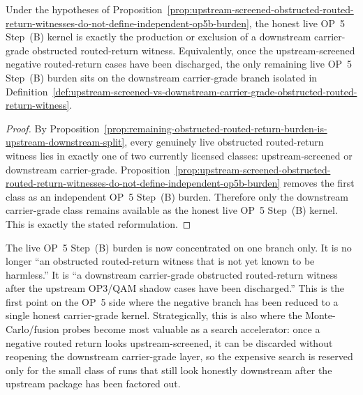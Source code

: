 \begin{corollary}
\label{cor:live-op5b-kernel-reduces-to-downstream-carrier-grade-obstructed-routed-return-branch}
Under the hypotheses of Proposition~\ref{prop:upstream-screened-obstructed-routed-return-witnesses-do-not-define-independent-op5b-burden}, the honest live OP~5 Step~(B) kernel is exactly the production or exclusion of a downstream carrier-grade obstructed routed-return witness. Equivalently, once the upstream-screened negative routed-return cases have been discharged, the only remaining live OP~5 Step~(B) burden sits on the downstream carrier-grade branch isolated in Definition~\ref{def:upstream-screened-vs-downstream-carrier-grade-obstructed-routed-return-witness}.
\end{corollary}

\begin{proof}
By Proposition~\ref{prop:remaining-obstructed-routed-return-burden-is-upstream-downstream-split}, every genuinely live obstructed routed-return witness lies in exactly one of two currently licensed classes: upstream-screened or downstream carrier-grade. Proposition~\ref{prop:upstream-screened-obstructed-routed-return-witnesses-do-not-define-independent-op5b-burden} removes the first class as an independent OP~5 Step~(B) burden. Therefore only the downstream carrier-grade class remains available as the honest live OP~5 Step~(B) kernel. This is exactly the stated reformulation.
\end{proof}

\begin{remark}
\label{rem:what-fourth-op5b-sharpening-buys}
The live OP~5 Step~(B) burden is now concentrated on one branch only. It is no longer ``an obstructed routed-return witness that is not yet known to be harmless.'' It is ``a downstream carrier-grade obstructed routed-return witness after the upstream OP3/QAM shadow cases have been discharged.'' This is the first point on the OP~5 side where the negative branch has been reduced to a single honest carrier-grade kernel. Strategically, this is also where the Monte-Carlo/fusion probes become most valuable as a search accelerator: once a negative routed return looks upstream-screened, it can be discarded without reopening the downstream carrier-grade layer, so the expensive search is reserved only for the small class of runs that still look honestly downstream after the upstream package has been factored out.
\end{remark}



